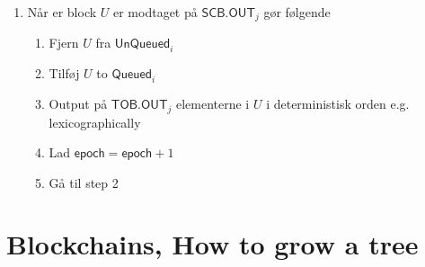 \documentclass[a4, english]{article}
\begin{document}
\begin{framed}
\begin{itemize}
\begin{enumerate}
\begin{itemize}
      \end{itemize}
      \item Når er block $U$ er modtaget på $\mathsf{SCB}.\mathsf{OUT}_j$ gør følgende
      \begin{enumerate}
      	\item Fjern $U$ fra $\mathsf{UnQueued}_i$  
        \item Tilføj $U$ to $\mathsf{Queued}_i$ 
        \item Output på $\mathsf{TOB}.\mathsf{OUT}_j$ elementerne i $U$ i deterministisk orden e.g. lexicographically 
        \item Lad $\mathsf{epoch}=\mathsf{epoch} +1$ 
        \item Gå til step 2 
      \end{enumerate}
    \end{enumerate}
  \end{itemize}
\end{framed}

\newpage

\section{Blockchains, How to grow a tree}
\end{document}
